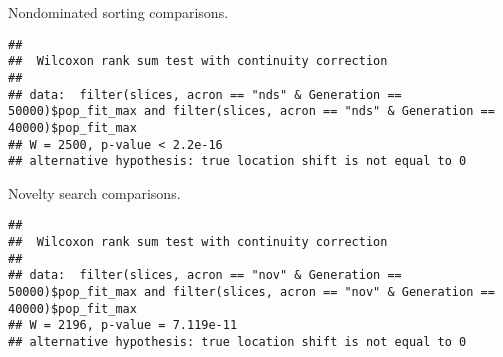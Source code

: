 \documentclass[]{book}
\newenvironment{Shaded}{\begin{snugshade}}{\end{snugshade}}
\newcommand{\DataTypeTok}[1]{\textcolor[rgb]{0.13,0.29,0.53}{#1}}
\newcommand{\DecValTok}[1]{\textcolor[rgb]{0.00,0.00,0.81}{#1}}
\newcommand{\KeywordTok}[1]{\textcolor[rgb]{0.13,0.29,0.53}{\textbf{#1}}}
\newcommand{\NormalTok}[1]{#1}
\newcommand{\OperatorTok}[1]{\textcolor[rgb]{0.81,0.36,0.00}{\textbf{#1}}}
\newcommand{\StringTok}[1]{\textcolor[rgb]{0.31,0.60,0.02}{#1}}
\begin{document}
Nondominated sorting comparisons.

\begin{Shaded}
\end{Shaded}

\begin{verbatim}
## 
##  Wilcoxon rank sum test with continuity correction
## 
## data:  filter(slices, acron == "nds" & Generation == 50000)$pop_fit_max and filter(slices, acron == "nds" & Generation == 40000)$pop_fit_max
## W = 2500, p-value < 2.2e-16
## alternative hypothesis: true location shift is not equal to 0
\end{verbatim}

Novelty search comparisons.

\begin{Shaded}
\end{Shaded}

\begin{verbatim}
## 
##  Wilcoxon rank sum test with continuity correction
## 
## data:  filter(slices, acron == "nov" & Generation == 50000)$pop_fit_max and filter(slices, acron == "nov" & Generation == 40000)$pop_fit_max
## W = 2196, p-value = 7.119e-11
## alternative hypothesis: true location shift is not equal to 0
\end{verbatim}
\end{document}
